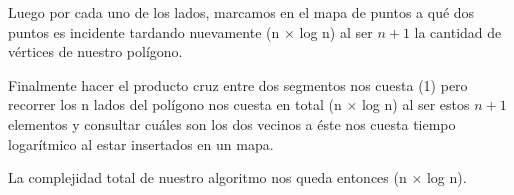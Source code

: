 Luego por cada uno de los lados, marcamos en el mapa de puntos a qué dos puntos es incidente tardando nuevamente \bigo(n $\times$ log n) al ser $n + 1$ la cantidad de vértices de nuestro polígono.\newline

Finalmente hacer el producto cruz entre dos segmentos nos cuesta \bigo(1) pero recorrer los n lados del polígono nos cuesta en total \bigo(n $\times$ log n) al ser estos $n+1$ elementos y consultar cuáles son los dos vecinos a éste nos cuesta tiempo logarítmico al estar insertados en un mapa.\newline

La complejidad total de nuestro algoritmo nos queda entonces \bigo(n $\times$ log n).\newline